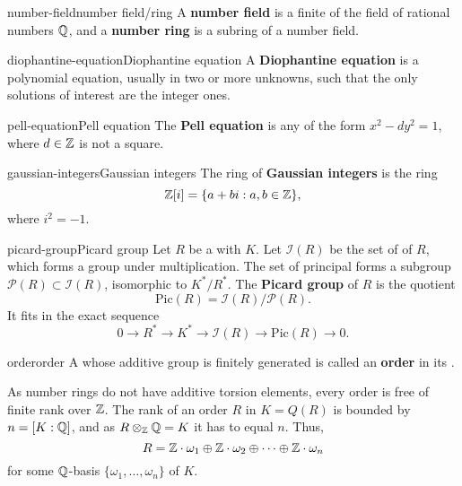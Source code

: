 \begin{topic}{number-field}{number field/ring}
    A \textbf{number field} is a finite  of the field of rational numbers $\mathbb{Q}$, and a \textbf{number ring} is a subring of a number field.
\end{topic}

\begin{topic}{diophantine-equation}{Diophantine equation}
    A \textbf{Diophantine equation} is a polynomial equation, usually in two or more unknowns, such that the only solutions of interest are the integer ones.
\end{topic}

\begin{topic}{pell-equation}{Pell equation}
    The \textbf{Pell equation} is any  of the form $x^2 - dy^2 = 1$, where $d \in \mathbb{Z}$ is not a square.
\end{topic}

\begin{topic}{gaussian-integers}{Gaussian integers}
    The ring of \textbf{Gaussian integers} is the ring
    \[ \mathbb{Z}[i] = \{ a + bi : a, b \in \mathbb{Z} \}, \]
    where $i^2 = -1$.
\end{topic}

\begin{topic}{picard-group}{Picard group}
    Let $R$ be a  with  $K$. Let $\mathcal{I}(R)$ be the set of  of $R$, which forms a group under multiplication. The set of principal  forms a subgroup $\mathcal{P}(R) \subset \mathcal{I}(R)$, isomorphic to $K^* / R^*$. The \textbf{Picard group} of $R$ is the quotient
    \[ \text{Pic}(R) = \mathcal{I}(R) / \mathcal{P}(R) . \]
    It fits in the exact sequence
    \[ 0 \to R^* \to K^* \to \mathcal{I}(R) \to \text{Pic}(R) \to 0 . \]
\end{topic}

\begin{topic}{order}{order}
    A  whose additive group is finitely generated is called an \textbf{order} in its .
    
    As number rings do not have additive torsion elements, every order is free of finite rank over $\mathbb{Z}$. The rank of an order $R$ in $K = Q(R)$ is bounded by $n = [ K : \mathbb{Q} ]$, and as $R \otimes_{\mathbb{Z}} \mathbb{Q} = K$ it has to equal $n$. Thus,
    \[ R = \mathbb{Z} \cdot \omega_1 \oplus \mathbb{Z} \cdot \omega_2 \oplus \cdots \oplus \mathbb{Z} \cdot \omega_n \]
    for some $\mathbb{Q}$-basis $\{ \omega_1, \ldots, \omega_n \}$ of $K$.
\end{topic}

